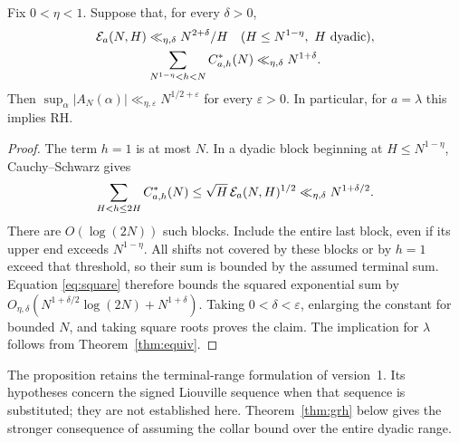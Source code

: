 \begin{proposition}
\label{prop:v1-terminal}
Fix \(0<\eta<1\). Suppose that, for every \(\delta>0\),
\begin{gather*}
 \mathcal E_a(N,H)\ll_{\eta,\delta}N^{2+\delta}/H
 \quad(H\le N^{1-\eta},\ H\text{ dyadic}),\\
 \sum_{N^{1-\eta}<h<N}C^*_{a,h}(N)
        \ll_{\eta,\delta}N^{1+\delta}.
\end{gather*}
Then \(\sup_\alpha|A_N(\alpha)|\ll_{\eta,\varepsilon}
N^{1/2+\varepsilon}\) for every \(\varepsilon>0\).
In particular, for \(a=\lambda\) this implies RH.
\end{proposition}
\begin{proof}
The term \(h=1\) is at most \(N\). In a dyadic block beginning
at \(H\le N^{1-\eta}\), Cauchy--Schwarz gives
\[
 \sum_{H<h\le2H}C^*_{a,h}(N)
 \le\sqrt H\,\mathcal E_a(N,H)^{1/2}
 \ll_{\eta,\delta}N^{1+\delta/2}.
\]
There are \(O(\log(2N))\) such blocks. Include the entire last
block, even if its upper end exceeds \(N^{1-\eta}\). All shifts
not covered by these blocks or by \(h=1\) exceed that threshold,
so their sum is bounded by the assumed terminal sum. Equation
\eqref{eq:square} therefore bounds the squared exponential sum by
\(O_{\eta,\delta}(N^{1+\delta/2}\log(2N)+N^{1+\delta})\).
Taking \(0<\delta<\varepsilon\), enlarging the constant for bounded
\(N\), and taking square roots proves the claim. The implication
for \(\lambda\) follows from Theorem~\ref{thm:equiv}.
\end{proof}

The proposition retains the terminal-range formulation of
version~1. Its hypotheses concern the signed Liouville sequence
when that sequence is substituted; they are not established here.
Theorem~\ref{thm:grh} below gives the stronger consequence of
assuming the collar bound over the entire dyadic range.
